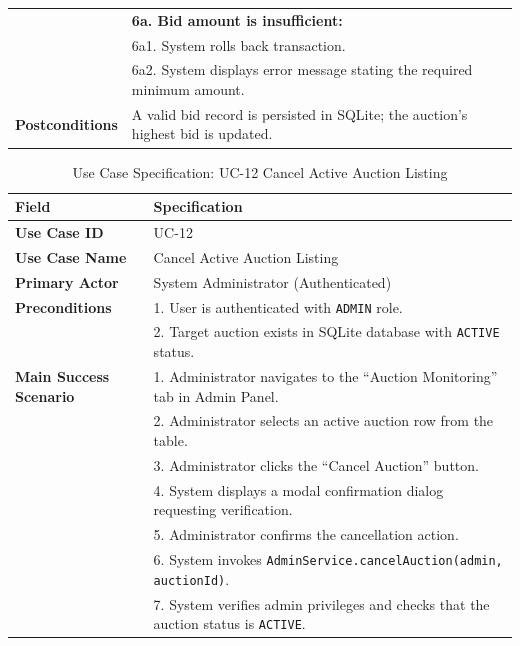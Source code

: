 \begin{table}[H]
\begin{tabularx}{\textwidth}{p{3.5cm}X}
                                        & \textbf{6a. Bid amount is insufficient:}\\
                                        & \quad 6a1. System rolls back transaction.\\
                                        & \quad 6a2. System displays error message stating the required minimum amount.\\
\textbf{Postconditions} & A valid bid record is persisted in SQLite; the auction's highest bid is updated. \\
\bottomrule
\end{tabularx}
\end{table}

\begin{table}[H]
\centering
\small
\caption{Use Case Specification: UC-12 Cancel Active Auction Listing}
\label{tab:uc_cancel}
\begin{tabularx}{\textwidth}{p{3.5cm}X}
\toprule
\textbf{Field} & \textbf{Specification} \\
\midrule
\textbf{Use Case ID} & UC-12 \\
\textbf{Use Case Name} & Cancel Active Auction Listing \\
\textbf{Primary Actor} & System Administrator (Authenticated) \\
\textbf{Preconditions} & 1. User is authenticated with \texttt{ADMIN} role.\\
                       & 2. Target auction exists in SQLite database with \texttt{ACTIVE} status. \\
\textbf{Main Success Scenario} & 1. Administrator navigates to the ``Auction Monitoring'' tab in Admin Panel.\\
                               & 2. Administrator selects an active auction row from the table.\\
                               & 3. Administrator clicks the ``Cancel Auction'' button.\\
                               & 4. System displays a modal confirmation dialog requesting verification.\\
                               & 5. Administrator confirms the cancellation action.\\
                               & 6. System invokes \texttt{AdminService.cancelAuction(admin, auctionId)}.\\
                               & 7. System verifies admin privileges and checks that the auction status is \texttt{ACTIVE}.\\

\end{tabularx}
\end{table}

